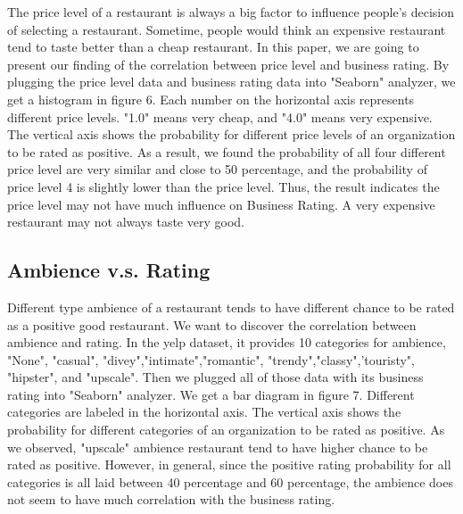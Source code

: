 \documentclass{article}
\begin{document}
The price level of a restaurant is always a big factor to influence people's decision of selecting a restaurant. Sometime, people would think an expensive restaurant tend to taste better than a cheap restaurant. In this paper, we are going to present our finding of the correlation between price level and business rating. By plugging the price level data and business rating data into "Seaborn" analyzer, we get a histogram in figure 6. Each number on the horizontal axis represents different price levels. "1.0" means very cheap, and "4.0" means very expensive. The vertical axis shows the probability for different price levels of an organization to be rated as positive. As a result, we found the probability of all four different price level are very similar and close to 50 percentage, and the probability of price level 4 is slightly lower than the price level. Thus, the result indicates the price level may not have much influence on Business Rating. A very expensive restaurant may not always taste very good.

\subsection{Ambience v.s. Rating}

Different type ambience of a restaurant tends to have different chance to be rated as a positive good restaurant. We want to discover the correlation between ambience and rating. In the yelp dataset, it provides 10 categories for ambience, "None", "casual", "divey","intimate","romantic", "trendy","classy",'touristy", "hipster", and "upscale". Then we plugged all of those data with its business rating into "Seaborn" analyzer. We get a bar diagram in figure 7. Different categories are labeled in the horizontal axis. The vertical axis shows the probability for different categories of an organization to be rated as positive. As we observed, "upscale" ambience restaurant tend to have higher chance to be rated as positive. However, in general, since the positive rating probability for all categories is all laid between 40 percentage and 60 percentage, the ambience does not seem to have much correlation with the business rating.
\end{document}
